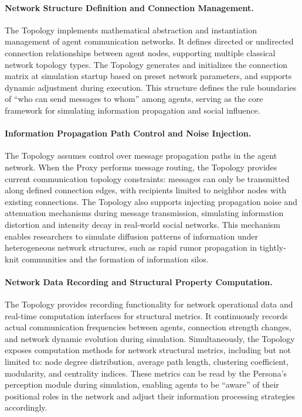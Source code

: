 \documentclass{article}
\begin{document}
\paragraph{Network Structure Definition and Connection Management.}
The Topology implements mathematical abstraction and instantiation management of agent communication networks. It defines directed or undirected connection relationships between agent nodes, supporting multiple classical network topology types. The Topology generates and initializes the connection matrix at simulation startup based on preset network parameters, and supports dynamic adjustment during execution. This structure defines the rule boundaries of ``who can send messages to whom'' among agents, serving as the core framework for simulating information propagation and social influence.

\paragraph{Information Propagation Path Control and Noise Injection.}
The Topology assumes control over message propagation paths in the agent network. When the Proxy performs message routing, the Topology provides current communication topology constraints: messages can only be transmitted along defined connection edges, with recipients limited to neighbor nodes with existing connections. The Topology also supports injecting propagation noise and attenuation mechanisms during message transmission, simulating information distortion and intensity decay in real-world social networks. This mechanism enables researchers to simulate diffusion patterns of information under heterogeneous network structures, such as rapid rumor propagation in tightly-knit communities and the formation of information silos.

\paragraph{Network Data Recording and Structural Property Computation.}
The Topology provides recording functionality for network operational data and real-time computation interfaces for structural metrics. It continuously records actual communication frequencies between agents, connection strength changes, and network dynamic evolution during simulation. Simultaneously, the Topology exposes computation methods for network structural metrics, including but not limited to: node degree distribution, average path length, clustering coefficient, modularity, and centrality indices. These metrics can be read by the Persona's perception module during simulation, enabling agents to be ``aware'' of their positional roles in the network and adjust their information processing strategies accordingly.
\end{document}
